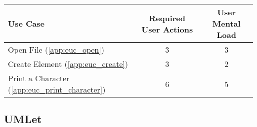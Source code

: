 


\begin{tabularx}{\textwidth}{Xcc}
\textbf{Use Case} & \textbf{Required User Actions} & \textbf{User Mental Load}\\
\hline
Open File (\ref{app:euc_open})                       & 3 & 3 \\
Create Element (\ref{app:euc_create})                & 3 & 2 \\
Print a Character (\ref{app:euc_print_character})    & 6 & 5
\end{tabularx}

\subsection*{UMLet}




